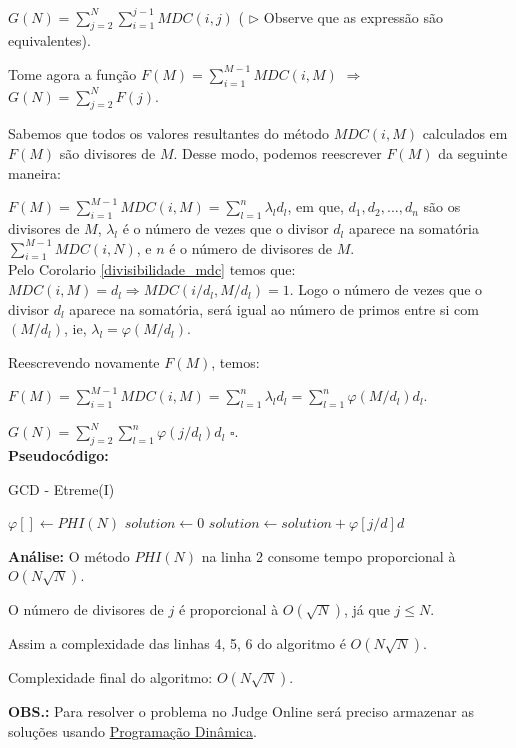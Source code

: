 $G(N) = \sum_{j=2}^N\sum_{i=1}^{j-1}MDC(i,j)$ ( $\rhd$ Observe que as expressão são equivalentes).

Tome agora a função $F(M) = \sum_{i=1}^{M-1}MDC(i, M)$ $\Rightarrow$ $G(N) = \sum_{j=2}^NF(j)$.

Sabemos que todos os valores resultantes do método $MDC(i,M)$ calculados em $F(M)$ são divisores de $M$. Desse modo, podemos reescrever $F(M)$ da seguinte maneira:

$F(M) = \sum_{i=1}^{M-1}MDC(i, M) = \sum_{l=1}^{n}\lambda_l d_l$, em que, $d_1, d_2,..., d_n$ são os divisores de $M$, $\lambda_l$ é o número de vezes que o divisor $d_l$ aparece na somatória $\sum_{i=1}^{M-1}MDC(i,N)$, e $n$ é o número de divisores de $M$.
\\

Pelo Corolario \autoref{divisibilidade_mdc} temos que: $MDC(i,M) = d_l \Rightarrow MDC(i/d_l,M/d_l) = 1$. Logo o número de vezes que o divisor $d_l$ aparece na somatória, será igual ao número de primos entre si com $(M/d_l)$, ie, $\lambda_l = \varphi(M/d_l)$.

Reescrevendo novamente $F(M)$, temos:

$F(M) = \sum_{i=1}^{M-1}MDC(i, M) = \sum_{l=1}^n \lambda_l d_l = \sum_{l=1}^n \varphi(M/d_l) d_l$.

$G(N) = \sum_{j=2}^N \sum_{l=1}^n \varphi(j/d_l)d_l$ $\square$.
\\

\textbf{Pseudocódigo:}
\begin{algorithm}
\caption{GCD - Etreme(I)}\label{gcd_extreme}
\begin{algorithmic}[1]
\State $\varphi[] \gets PHI(N)$
\State $solution \gets 0$
\State $solution \gets solution + \varphi[j/d] d$
\EndFor
\EndFor
\State {}
\EndProcedure
\end{algorithmic}
\end{algorithm}


\textbf{Análise:}
O método $PHI(N)$ na linha 2 consome tempo proporcional à $O(N\sqrt{N})$.

O número de divisores de $j$ é proporcional à $O(\sqrt{N})$, já que $j \leq N$.

Assim a complexidade das linhas 4, 5, 6 do algoritmo é $O(N\sqrt{N})$.

Complexidade final do algoritmo: $O(N\sqrt{N})$.

\textbf{OBS.:} Para resolver o problema no Judge Online será preciso armazenar as soluções usando \href{https://linux.ime.usp.br/~stefanot/mac499/template.pdf}{Programação Dinâmica}.







